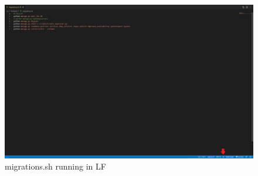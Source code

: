 \documentclass{article}
\begin{document}
\begin{figure}[H]
    \includegraphics[width=1\textwidth]{images/lf.png}
    \caption{migrations.sh running in LF}
\end{figure}
\end{document}
